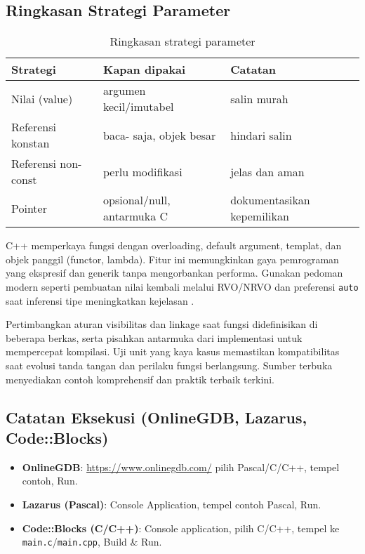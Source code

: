 \documentclass[../main.tex]{subfiles}
\begin{document}
\subsection{Ringkasan Strategi Parameter}
\begin{table}[h]
  \centering
  \caption{Ringkasan strategi parameter}
  \begin{tabular}{@{}lll@{}}
    \toprule
    Strategi & Kapan dipakai & Catatan \\
    \midrule
    Nilai (value) & argumen kecil/imutabel & salin murah \\
    Referensi konstan & baca- saja, objek besar & hindari salin \\
    Referensi non-const & perlu modifikasi & jelas dan aman \\
    Pointer & opsional/null, antarmuka C & dokumentasikan kepemilikan \\
    \bottomrule
  \end{tabular}
\end{table}
C++ memperkaya fungsi dengan overloading, default argument, templat, dan objek panggil (functor, lambda). Fitur ini memungkinkan gaya pemrograman yang ekspresif dan generik tanpa mengorbankan performa. Gunakan pedoman modern seperti pembuatan nilai kembali melalui RVO/NRVO dan preferensi \texttt{auto} saat inferensi tipe meningkatkan kejelasan \parencite{cpp-functions,cpp-reference}.

Pertimbangkan aturan visibilitas dan linkage saat fungsi didefinisikan di beberapa berkas, serta pisahkan antarmuka dari implementasi untuk mempercepat kompilasi. Uji unit yang kaya kasus memastikan kompatibilitas saat evolusi tanda tangan dan perilaku fungsi berlangsung. Sumber terbuka menyediakan contoh komprehensif dan praktik terbaik terkini.
\subsection{Catatan Eksekusi (OnlineGDB, Lazarus, Code::Blocks)}
\begin{itemize}
  \item \textbf{OnlineGDB}: \url{https://www.onlinegdb.com/} \textrightarrow{} pilih Pascal/C/C++, tempel contoh, Run.
  \item \textbf{Lazarus (Pascal)}: Console Application, tempel contoh Pascal, Run.
  \item \textbf{Code::Blocks (C/C++)}: Console application, pilih C/C++, tempel ke \texttt{main.c}/\texttt{main.cpp}, Build \& Run.
\end{itemize}
\end{document}
